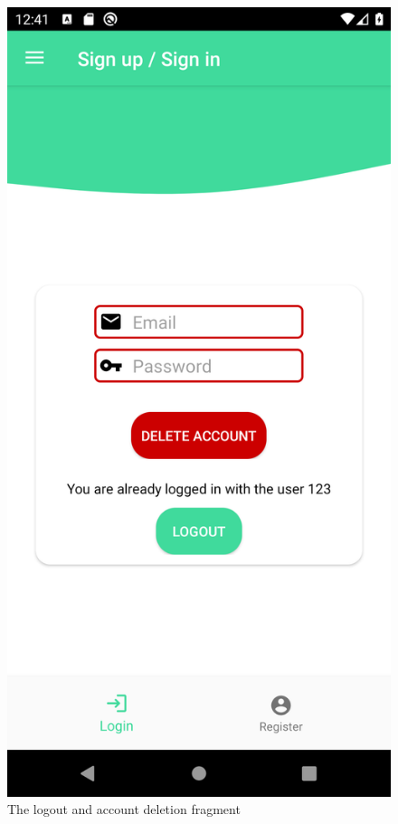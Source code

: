 \begin{figure}[H]
    \centering
    \includegraphics[scale=0.12]{_figures/logout_fragment.png}
    \caption{The logout and account deletion fragment}
\end{figure}

